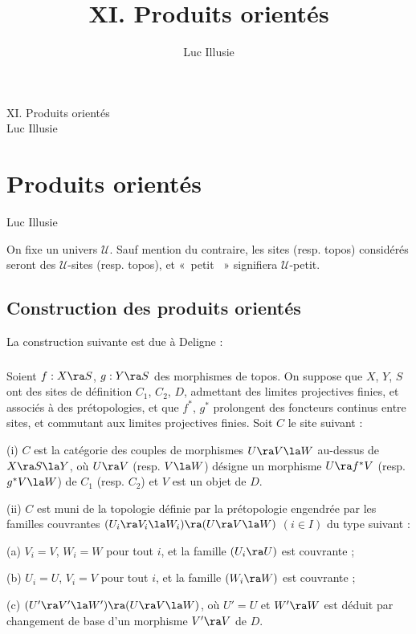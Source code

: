 \documentclass[10pt]{../fichiers-configuration-latex/smfart}
\author{Luc Illusie}
\title{XI. Produits orientés}
\begin{document}
\begin{center}
XI. Produits orientés\\
Luc Illusie
\end{center}

\else
{}
\chapter{Produits orientés}
\begin{center}
Luc Illusie
\end{center}
\fi

On fixe un univers $\mathscr{U}$. Sauf mention du contraire, les sites (resp. topos) considérés
seront des $\mathscr{U}$-sites (resp. topos), et « petit  » signifiera $\mathscr{U}$-petit.

\section{Construction des produits orientés} La construction suivante est due à Deligne
\cite{AG_Tokyo-Kyoto@Laumon} :

\subsection{}\label{11-site} Soient $f : X \ra S$, $g : Y \ra S$ des
morphismes de topos. On suppose que $X$, $Y$, $S$ ont des sites de définition  $C_1$, $C_2$, $D$,
admettant des limites projectives finies, et associés à des prétopologies, et que $f^{*}$, $g^{*}$
prolongent des foncteurs continus entre sites, et commutant aux limites projectives finies. Soit $C$
le site suivant :

(i) $C$ est la catégorie des couples de morphismes $U \ra V \la W$ au-dessus de $X \ra S \la Y$, où
$U \ra V$ (resp. $V \la W$) désigne un morphisme $U \ra f^{*}V$ (resp. $g^{*}V \la W$) de $C_1$
(resp. $C_2$) et $V$ est un objet de $D$.

(ii) $C$ est muni de la topologie définie par la prétopologie engendrée par les familles couvrantes
$(U_i \ra V_i \la W_i) \ra (U \ra V \la W)$ $(i \in I)$ du type suivant :

(a) $V_i = V$, $W_i = W$ pour tout $i$, et la famille $(U_i \ra U)$ est couvrante ;

(b) $U_i = U$, $V_i = V$ pour tout $i$, et la famille $(W_i \ra W)$ est couvrante ;

(c) $(U' \ra V' \la W') \ra (U \ra V \la W)$, où $U' = U$ et $W' \ra W$ est déduit par changement de
base d'un morphisme $V' \ra V$ de $D$. 
\end{document}
